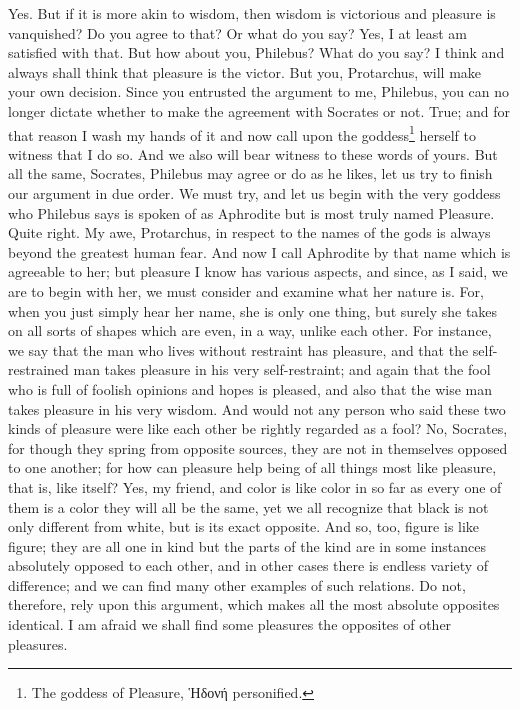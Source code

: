 \documentclass[letterpaper,12pt]{article}
\newcommand{\textgreek}[1]{\begingroup\fontencoding{LGR}\selectfont#1\endgroup}
\newcommand{\stephpag}[1]{\marginnote{\small\itshape\fontfamily{ppl}\selectfont #1}}
\begin{document}
\begin{drama}
\protarchusspeaks
Yes.
\socratesspeaks
But if it is more akin to wisdom, then wisdom is victorious and pleasure is vanquished? Do you agree to that? Or what do you say?
\protarchusspeaks
Yes, I at least am satisfied with that.
\socratesspeaks
But how about you, Philebus? What do you say?
\philebusspeaks
I think and always shall think that pleasure is the victor. But you, Protarchus, will make your own decision.
\protarchusspeaks
Since you entrusted the argument to me, Philebus, you can no longer dictate whether to make the agreement with Socrates or not. \stephpag{b}
\philebusspeaks
True; and for that reason I wash my hands of it and now call upon the goddess\footnote{The goddess of Pleasure, \textgreek{Ἡδονή} personified.} herself to witness that I do so.
\protarchusspeaks
And we also will bear witness to these words of yours. But all the same, Socrates, Philebus may agree or do as he likes, let us try to finish our argument in due order.
\socratesspeaks
We must try, and let us begin with the very goddess who Philebus says is spoken of as Aphrodite but is most truly named Pleasure.
\protarchusspeaks
Quite right. \stephpag{c}
\socratesspeaks
My awe, Protarchus, in respect to the names of the gods is always beyond the greatest human fear. And now I call Aphrodite by that name which is agreeable to her; but pleasure I know has various aspects, and since, as I said, we are to begin with her, we must consider and examine what her nature is. For, when you just simply hear her name, she is only one thing, but surely she takes on all sorts of shapes which are even, in a way, unlike each other. For instance, we say that the man \stephpag{d} who lives without restraint has pleasure, and that the self-restrained man takes pleasure in his very self-restraint; and again that the fool who is full of foolish opinions and hopes is pleased, and also that the wise man takes pleasure in his very wisdom. And would not any person who said these two kinds of pleasure were like each other be rightly regarded as a fool?
\protarchusspeaks
No, Socrates, for though they spring from opposite sources, they are not in themselves opposed to one another; \stephpag{e} for how can pleasure help being of all things most like pleasure, that is, like itself?
\socratesspeaks
Yes, my friend, and color is like color in so far as every one of them is a color they will all be the same, yet we all recognize that black is not only different from white, but is its exact opposite. And so, too, figure is like figure; they are all one in kind but the parts of the kind are in some instances absolutely opposed to each other, \stephpag{13 a} and in other cases there is endless variety of difference; and we can find many other examples of such relations. Do not, therefore, rely upon this argument, which makes all the most absolute opposites identical. I am afraid we shall find some pleasures the opposites of other pleasures.

\end{drama}
\end{document}
